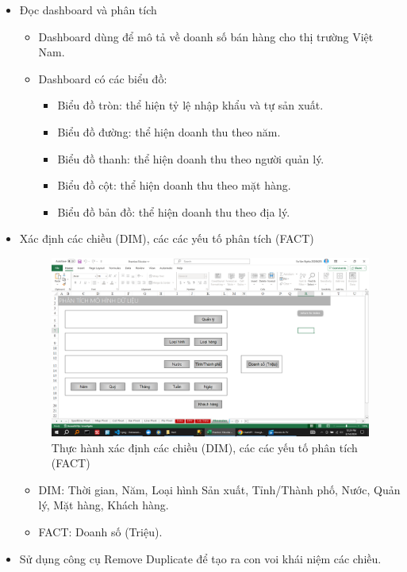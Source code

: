 \documentclass{article}
\begin{document}
\begin{itemize}
\item Đọc dashboard và phân tích
\begin{itemize}
\item Dashboard dùng để mô tả về doanh số bán hàng cho thị trường Việt Nam.
\item Dashboard có các biểu đồ:
\begin{itemize}
\item Biểu đồ tròn: thể hiện tỷ lệ nhập khẩu và tự sản xuất.
\item Biểu đồ đường: thể hiện doanh thu theo năm.
\item Biểu đồ thanh: thể hiện doanh thu theo người quản lý.
\item Biểu đồ cột: thể hiện doanh thu theo mặt hàng.
\item Biểu đồ bản đồ: thể hiện doanh thu theo địa lý.
\end{itemize}
\end{itemize}
\item Xác định các chiều (DIM), các các yếu tố phân tích (FACT)

\begin{figure}[H]
\centering
\includegraphics[scale = 0.15]{Bai1/ThucHanh/1.png}
\caption{Thực hành xác định các chiều (DIM), các các yếu tố phân tích (FACT)}
\end{figure}

\begin{itemize}
\item DIM: Thời gian, Năm, Loại hình Sản xuất, Tỉnh/Thành phố, Nước, Quản lý, Mặt hàng, Khách hàng.
\item FACT: Doanh số (Triệu).
\end{itemize}

\item Sử dụng công cụ Remove Duplicate để tạo ra con voi khái niệm các chiều.


\end{itemize}
\end{document}
